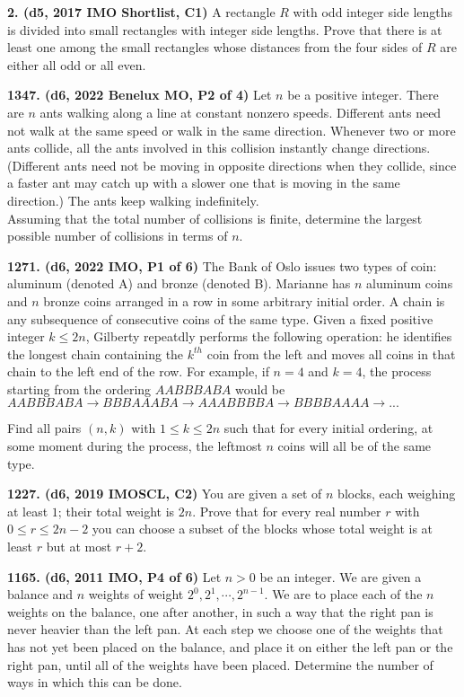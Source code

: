 \documentclass{article}
\begin{document}
        \textbf{2. (\color{red}d5\color{black}, 2017 IMO Shortlist, C1)} A rectangle $R$ with odd integer side lengths is divided into small rectangles with integer side lengths. Prove that there is at least one among the small rectangles whose distances from the four sides of $R$ are either all odd or all even.

        \textbf{1347. (\color{red}d6\color{black}, 2022 Benelux MO, P2 of 4)} Let $n$ be a positive integer. There are $n$ ants walking along a line at constant nonzero speeds. Different ants need not walk at the same speed or walk in the same direction. Whenever two or more ants collide, all the ants involved in this collision instantly change directions. (Different ants need not be moving in opposite directions when they collide, since a faster ant may catch up with a slower one that is moving in the same direction.) The ants keep walking indefinitely.\\ Assuming that the total number of collisions is finite, determine the largest possible number of collisions in terms of $n$.

        \textbf{1271. (\color{red}d6\color{black}, 2022 IMO, P1 of 6)} The Bank of Oslo issues two types of coin: aluminum (denoted A) and bronze (denoted B). Marianne has $n$ aluminum coins and $n$ bronze coins arranged in a row in some arbitrary initial order. A chain is any subsequence of consecutive coins of the same type. Given a fixed positive integer $k \leq 2n$, Gilberty repeatdly performs the following operation: he identifies the longest chain containing the $k^{th}$ coin from the left and moves all coins in that chain to the left end of the row. For example, if $n=4$ and $k=4$, the process starting from the ordering $AABBBABA$ would be $AABBBABA \to BBBAAABA \to AAABBBBA \to BBBBAAAA \to ...$

        Find all pairs $(n,k)$ with $1 \leq k \leq 2n$ such that for every initial ordering, at some moment during the process, the leftmost $n$ coins will all be of the same type.

        \textbf{1227. (\color{red}d6\color{black}, 2019 IMOSCL, C2)} You are given a set of $n$ blocks, each weighing at least $1$; their total weight is $2n$. Prove that for every real number $r$ with $0 \leq r \leq 2n-2$ you can choose a subset of the blocks whose total weight is at least $r$ but at most $r+2$.

        \textbf{1165. (\color{red}d6\color{black}, 2011 IMO, P4 of 6)} Let $n > 0$ be an integer. We are given a balance and $n$ weights of weight $2^0, 2^1, \cdots, 2^{n-1}$. We are to place each of the $n$ weights on the balance, one after another, in such a way that the right pan is never heavier than the left pan. At each step we choose one of the weights that has not yet been placed on the balance, and place it on either the left pan or the right pan, until all of the weights have been placed.
        Determine the number of ways in which this can be done.
\end{document}
